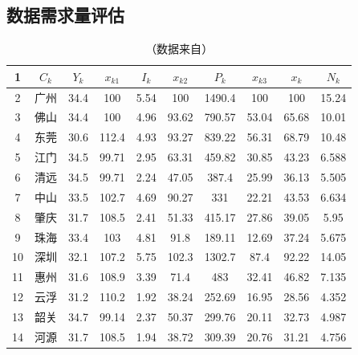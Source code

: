 \documentclass[UTF8,12pt]{ctexart}
\begin{document}
\begin{appendices}
    \section{数据需求量评估}\label{fuluCSSJ}
      \begin{table}[H]
        \centering
        \caption*{\small{（数据来自\cite{CSSJ}）}}
          \begin{tabular}{cccccccccc}
          \toprule
          1      & $C_k$ & $Y_k$ & $x_{k1}$ & $I_k$ & $x_{k2}$ & $P_k$ & $x_{k3}$ & $x_k$ & $N_k$ \\
          \midrule
          2      & 广州     & 34.4   & 100    & 5.54   & 100    & 1490.4 & 100    & 100    & 15.24 \\
          \midrule
          3      & 佛山     & 34.4   & 100    & 4.96   & 93.62  & 790.57 & 53.04  & 65.68  & 10.01 \\
          \midrule
          4      & 东莞     & 30.6   & 112.4  & 4.93   & 93.27  & 839.22 & 56.31  & 68.79  & 10.48 \\
          \midrule
          5      & 江门     & 34.5   & 99.71  & 2.95   & 63.31  & 459.82 & 30.85  & 43.23  & 6.588 \\
          \midrule
          6      & 清远     & 34.5   & 99.71  & 2.24   & 47.05  & 387.4  & 25.99  & 36.13  & 5.505 \\
          \midrule
          7      & 中山     & 33.5   & 102.7  & 4.69   & 90.27  & 331    & 22.21  & 43.53  & 6.634 \\
          \midrule
          8      & 肇庆     & 31.7   & 108.5  & 2.41   & 51.33  & 415.17 & 27.86  & 39.05  & 5.95 \\
          \midrule
          9      & 珠海     & 33.4   & 103    & 4.81   & 91.8   & 189.11 & 12.69  & 37.24  & 5.675 \\
          \midrule
          10     & 深圳     & 32.1   & 107.2  & 5.75   & 102.3  & 1302.7 & 87.4   & 92.22  & 14.05 \\
          \midrule
          11     & 惠州     & 31.6   & 108.9  & 3.39   & 71.4   & 483    & 32.41  & 46.82  & 7.135 \\
          \midrule
          12     & 云浮     & 31.2   & 110.2  & 1.92   & 38.24  & 252.69 & 16.95  & 28.56  & 4.352 \\
          \midrule
          13     & 韶关     & 34.7   & 99.14  & 2.37   & 50.37  & 299.76 & 20.11  & 32.73  & 4.987 \\
          \midrule
          14     & 河源     & 31.7   & 108.5  & 1.94   & 38.72  & 309.39 & 20.76  & 31.21  & 4.756 \\

\end{tabular}
\end{table}
\end{appendices}
\end{document}
